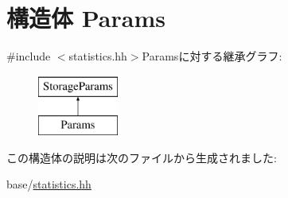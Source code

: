 \hypertarget{structStats_1_1AvgStor_1_1Params}{
\section{構造体 Params}
\label{structStats_1_1AvgStor_1_1Params}
}


{\ttfamily \#include $<$statistics.hh$>$}Paramsに対する継承グラフ:\begin{figure}[H]
\begin{center}
\leavevmode
\includegraphics[height=2cm]{structStats_1_1AvgStor_1_1Params}
\end{center}
\end{figure}


この構造体の説明は次のファイルから生成されました:\begin{DoxyCompactItemize}
\item 
base/\hyperlink{statistics_8hh}{statistics.hh}\end{DoxyCompactItemize}
